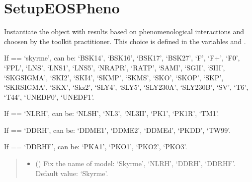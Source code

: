 \documentclass[letterpaper,10pt,english]{sphinxmanual}
\begin{document}
\sphinxstepscope


\section{SetupEOSPheno}
\label{\detokenize{source/api/setup_eos_pheno:setupeospheno}}\label{\detokenize{source/api/setup_eos_pheno::doc}}\label{\detokenize{source/api/setup_eos_pheno:module-nucleardatapy.setup_eos_pheno}}

\begin{fulllineitems}
\label{\detokenize{source/api/setup_eos_pheno:nucleardatapy.setup_eos_pheno.SetupEOSPheno}}
\pysigstartsignatures
\pysiglinewithargsret
{}
{\sphinxparamcomma {}}
{}
\pysigstopsignatures
\sphinxAtStartPar
Instantiate the object with results based on phenomenological    interactions and choosen by the toolkit practitioner.     This choice is defined in the variables  and .

\sphinxAtStartPar
If  == ‘skyrme’,  can be: ‘BSK14’,     ‘BSK16’, ‘BSK17’, ‘BSK27’, ‘F\sphinxhyphen{}’, ‘F+’, ‘F0’, ‘FPL’, ‘LNS’, ‘LNS1’, ‘LNS5’,     ‘NRAPR’, ‘RATP’, ‘SAMI’, ‘SGII’, ‘SIII’, ‘SKGSIGMA’, ‘SKI2’, ‘SKI4’, ‘SKMP’,     ‘SKMS’, ‘SKO’, ‘SKOP’, ‘SKP’, ‘SKRSIGMA’, ‘SKX’, ‘Skz2’, ‘SLY4’, ‘SLY5’,     ‘SLY230A’, ‘SLY230B’, ‘SV’, ‘T6’, ‘T44’, ‘UNEDF0’, ‘UNEDF1’.

\sphinxAtStartPar
If  == ‘NLRH’,  can be: ‘NL\sphinxhyphen{}SH’, ‘NL3’, ‘NL3II’, ‘PK1’, ‘PK1R’, ‘TM1’.

\sphinxAtStartPar
If  == ‘DDRH’,  can be: ‘DDME1’, ‘DDME2’, ‘DDMEd’, ‘PKDD’, ‘TW99’.

\sphinxAtStartPar
If  == ‘DDRHF’,  can be: ‘PKA1’, ‘PKO1’, ‘PKO2’, ‘PKO3’.
\begin{quote}\begin{description}
\begin{itemize}
\item {} 
\sphinxAtStartPar
{} (\sphinxstyleliteralemphasis{\sphinxupquote{, }}) \textendash{} Fix the name of model: ‘Skyrme’, ‘NLRH’,     ‘DDRH’, ‘DDRHF’. Default value: ‘Skyrme’.


\end{itemize}
\end{description}
\end{quote}
\end{fulllineitems}
\end{document}
